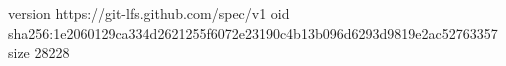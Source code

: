 version https://git-lfs.github.com/spec/v1
oid sha256:1e2060129ca334d2621255f6072e23190c4b13b096d6293d9819e2ac52763357
size 28228
